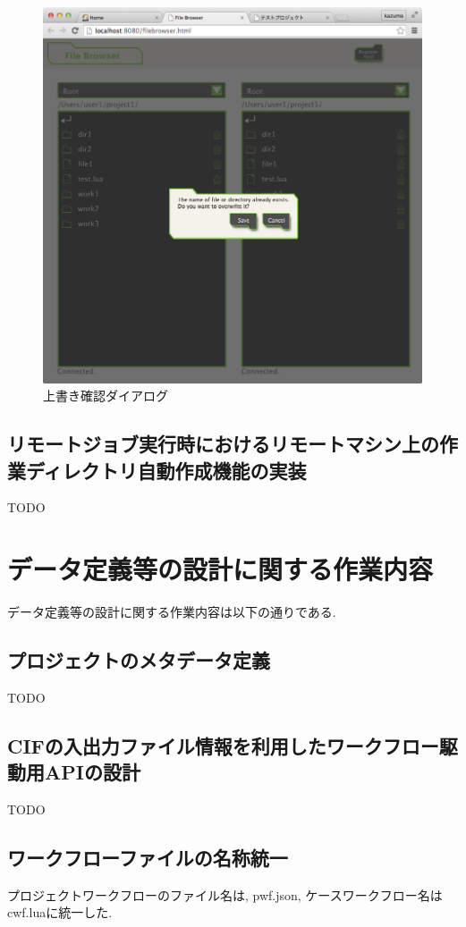 \documentclass[a4paper,10pt,oneside]{jsbook}
\begin{document}
\begin{figure}[htbp]
	\begin{center}
		\includegraphics[width=12.0cm]{image/confirm_dialog.png}
	\end{center}
	\caption{上書き確認ダイアログ}
	\label{fig:confirm_dialog}
\end{figure}


\section{リモートジョブ実行時におけるリモートマシン上の作業ディレクトリ自動作成機能の実装}
TODO

\chapter{データ定義等の設計に関する作業内容}
データ定義等の設計に関する作業内容は以下の通りである.

\section{プロジェクトのメタデータ定義}
TODO

\section{CIFの入出力ファイル情報を利用したワークフロー駆動用APIの設計}
TODO

\section{ワークフローファイルの名称統一}
プロジェクトワークフローのファイル名は, pwf.json, ケースワークフロー名は cwf.luaに統一した.
\end{document}
